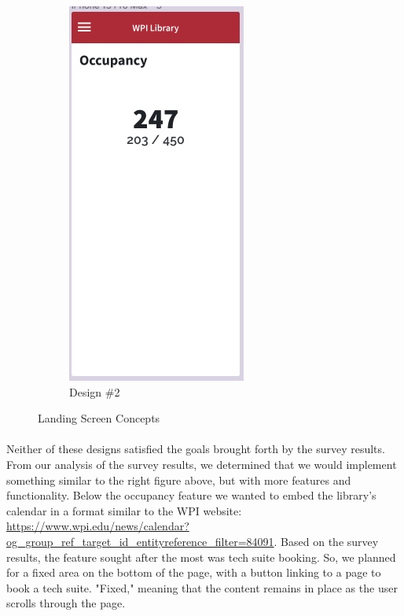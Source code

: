 \begin{figure}[H]
\begin{subfigure}{0.5\textwidth}
        \includegraphics[width=0.6\linewidth]{assets/img/main_2.jpg}
        \caption{Design \#2}
        \label{fig:main_screens_2}
    \end{subfigure}
    \caption{Landing Screen Concepts}
    \label{fig:main_screens}
\end{figure}

\paragraph{}
Neither of these designs satisfied the goals brought forth by the survey results. From our analysis of the survey results, we determined that we would implement something similar to the right figure above, but with more features and functionality. Below the occupancy feature we wanted to embed the library's calendar in a format similar to the WPI website: \url{https://www.wpi.edu/news/calendar?og_group_ref_target_id_entityreference_filter=84091}. Based on the survey results, the feature sought after the most was tech suite booking. So, we planned for a fixed area on the bottom of the page, with a button linking to a page to book a tech suite. "Fixed," meaning that the content remains in place as the user scrolls through the page.

